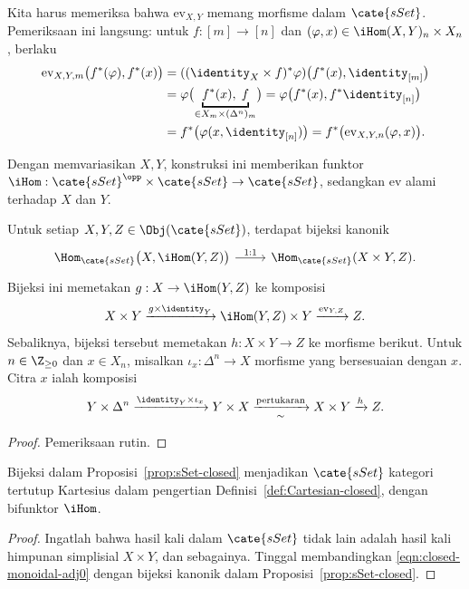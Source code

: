 Kita harus memeriksa bahwa $\mathrm{ev}_{X,Y}$ memang morfisme dalam
$\cate{sSet}$. Pemeriksaan ini langsung: untuk $f:[m]\to[n]$ dan
$(\varphi,x)\in\iHom(X,Y)_n\times X_n$, berlaku
\begin{align*}
	\mathrm{ev}_{X,Y,m}\bigl(f^*(\varphi),f^*(x)\bigr)
	&=((\identity_X\times f)^*\varphi)
	  \bigl(f^*(x),\identity_{[m]}\bigr)\\
	&=\varphi\bigl(
	  \underbracket{f^*(x),\;f}_{\in X_m\times(\Delta^n)_m}\bigr)
	 =\varphi\bigl(f^*(x),f^*\identity_{[n]}\bigr)\\
	&=f^*\bigl(\varphi(x,\identity_{[n]})\bigr)
	 =f^*\bigl(\mathrm{ev}_{X,Y,n}(\varphi,x)\bigr).
\end{align*}

Dengan memvariasikan $X,Y$, konstruksi ini memberikan funktor
$\iHom:\cate{sSet}^{\opp}\times\cate{sSet}\to\cate{sSet}$, sedangkan
$\mathrm{ev}$ alami terhadap $X$ dan $Y$.

\begin{proposition}\label{prop:sSet-closed}
	Untuk setiap $X,Y,Z\in\Obj(\cate{sSet})$, terdapat bijeksi kanonik
	\[\begin{tikzcd}
		\Hom_{\cate{sSet}}\bigl(X,\iHom(Y,Z)\bigr)
		\arrow[r,"1:1"]
		&\Hom_{\cate{sSet}}(X\times Y,Z).
	\end{tikzcd}\]
	Bijeksi ini memetakan $g:X\to\iHom(Y,Z)$ ke komposisi
	\[
	X\times Y\xrightarrow{g\times\identity_Y}
	\iHom(Y,Z)\times Y\xrightarrow{\mathrm{ev}_{Y,Z}}Z.
	\]
	Sebaliknya, bijeksi tersebut memetakan $h:X\times Y\to Z$ ke morfisme
	berikut. Untuk $n\in\Z_{\geq0}$ dan $x\in X_n$, misalkan
	$\iota_x:\Delta^n\to X$ morfisme yang bersesuaian dengan $x$. Citra $x$
	ialah komposisi
	\[
	Y\times\Delta^n\xrightarrow{\identity_Y\times\iota_x}Y\times X
	\xrightarrow[\sim]{\text{pertukaran}}X\times Y\xrightarrow{h}Z.
	\]
\end{proposition}
\begin{proof}
	Pemeriksaan rutin.
\end{proof}

\begin{corollary}
	Bijeksi dalam Proposisi~\ref{prop:sSet-closed} menjadikan $\cate{sSet}$
	kategori tertutup Kartesius dalam pengertian
	Definisi~\ref{def:Cartesian-closed}, dengan bifunktor $\iHom$.
\end{corollary}
\begin{proof}
	Ingatlah bahwa hasil kali dalam $\cate{sSet}$ tidak lain adalah hasil kali himpunan
	simplisial $X\times Y$, dan sebagainya. Tinggal membandingkan
	\eqref{eqn:closed-monoidal-adj0} dengan bijeksi kanonik dalam
	Proposisi~\ref{prop:sSet-closed}.
\end{proof}

